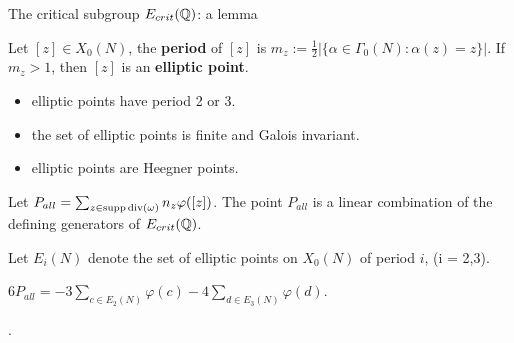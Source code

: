 \documentclass[handout]{beamer}
\begin{document}
\begin{frame}{The critical subgroup $E_{crit}(\mathbb{Q})$: a lemma}
\begin{Def}
Let $[z] \in X_0(N)$, the {\bf period} of $[z]$ is $m_z := \frac{1}{2}|\{\alpha \in \Gamma_0(N): \alpha(z) = z\}|$. If $m_z > 1$, then $[z]$ is an {\bf elliptic point}.
\end{Def}

\pause

\begin{itemize}
\item elliptic points have period 2 or 3. 
\item the set of elliptic points is finite and Galois invariant. 
\item elliptic points are Heegner points. 
\end{itemize}

\pause

Let $P_{all} = \sum_{z \in \operatorname{supp} \operatorname{div}(\omega)} n_z \varphi([z])$. The point $P_{all}$ is a linear combination of the defining generators of $E_{crit}(\mathbb{Q})$. \\

\smallskip
\pause

Let $E_i(N)$ denote the set of elliptic points on $X_0(N)$ of period $i$, (i = 2,3).\\

\pause
\begin{Lemma}[C.]
$6 P_{all} =  - 3 \sum_{c \in E_2(N)} \varphi(c) - 4 \sum_{d \in E_3(N)} \varphi(d)$. \\
\end{Lemma}

.
\end{frame}
\end{document}
